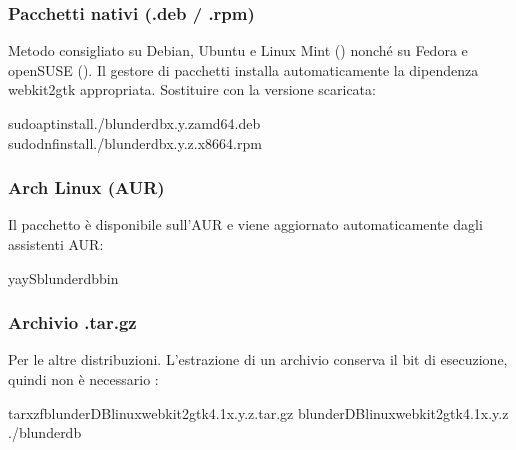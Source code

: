 \documentclass[letterpaper,10pt,italian]{sphinxmanual}
\begin{document}
\subsubsection{Pacchetti nativi (.deb / .rpm)}
\label{\detokenize{telecharge_install:paquets-natifs-deb-rpm}}
\sphinxAtStartPar
Metodo consigliato su Debian, Ubuntu e Linux Mint () nonché su Fedora e openSUSE (). Il gestore di pacchetti installa automaticamente la dipendenza webkit2gtk appropriata. Sostituire  con la versione scaricata:

\begin{sphinxVerbatim}[commandchars=\\\{\}]
sudoaptinstall./blunderdb\PYGZus{}x.y.z\PYGZus{}amd64.deb
sudodnfinstall./blunderdb\PYGZhy{}x.y.z.x86\PYGZus{}64.rpm
\end{sphinxVerbatim}


\subsubsection{Arch Linux (AUR)}
\label{\detokenize{telecharge_install:arch-linux-aur}}
\sphinxAtStartPar
Il pacchetto  è disponibile sull’AUR e viene aggiornato automaticamente dagli assistenti AUR:

\begin{sphinxVerbatim}[commandchars=\\\{\}]
yay\PYGZhy{}Sblunderdb\PYGZhy{}bin
\end{sphinxVerbatim}


\subsubsection{Archivio .tar.gz}
\label{\detokenize{telecharge_install:archive-tar-gz}}
\sphinxAtStartPar
Per le altre distribuzioni. L’estrazione di un archivio conserva il bit di esecuzione, quindi non è necessario :

\begin{sphinxVerbatim}[commandchars=\\\{\}]
tarxzfblunderDB\PYGZhy{}linux\PYGZhy{}webkit2gtk\PYGZhy{}4.1\PYGZhy{}x.y.z.tar.gz
blunderDB\PYGZhy{}linux\PYGZhy{}webkit2gtk\PYGZhy{}4.1\PYGZhy{}x.y.z
./blunderdb
\end{sphinxVerbatim}
\end{document}
